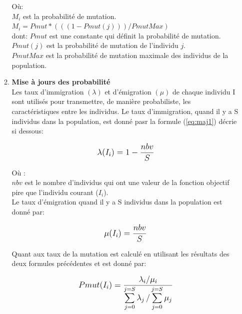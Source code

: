 \begin{enumerate}
\begin{enumerate}[label=\alph*)]
\begin{algorithm}[H]

\end{algorithm}

Où:\\
$M_i$ est la probabilité de mutation.\\
$M_i = Pmut * ( ( ( 1-Pmut(j))) / PmutMax)$ \\
dont: $Pmut$ est une constante qui définit  la probabilité de mutation.\\
$Pmut(j)$ est la probabilité de mutation de l’individu $j$. \\
$PmutMax$ est la probabilité de mutation maximale des individus de la population.\\

	\item \textbf{Mise à jours des probabilité}\\
	Les taux d’immigration $(\lambda)$ et d’émigration $(\mu)$ de chaque individu I sont utilisés pour transmettre, de manière probabiliste, les caractéristiques entre les individus.
Le taux d’immigration, quand il y a S individus dans la population, est donné pasr la formule (\ref{eq:maj1}) décrie si dessous:

\begin{equation}
	\label{eq:maj1}
	\mathlarger{
		\lambda(I_i) = 1 - \frac{nbv}{S}
	}
\end{equation}

Où :\\
$nbv$ est le nombre d’individus qui ont une valeur de la fonction objectif pire que l’individu courant ($I_i$).\\

Le taux d’émigration quand il y a S individus dans la population est donné par:

\begin{equation}
	\label{eq:maj2}
	\mathlarger{
		\mu(I_i) = \frac{nbv}{S}
	}
\end{equation}

Quant aux taux de la mutation est calculé en utilisant les résultats des deux formules précédentes et est donné par: 

\begin{equation}
	\label{eq:maj3}
	\mathlarger{
		Pmut(I_i) = \frac{
			\lambda_i / \mu_i 
		}{
			\mathlarger{\sum}_{j=0}^{j=S} \, \lambda_j  \, / \,
			\mathlarger{\sum}_{j=0}^{j=S} \, \mu_j
		}
	}
\end{equation}


\end{enumerate}
\end{enumerate}
